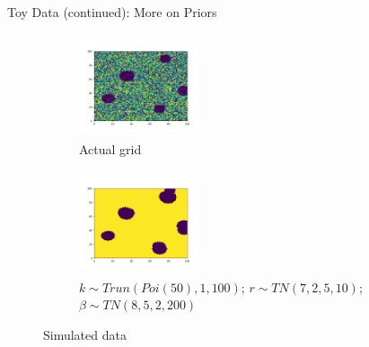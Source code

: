 \documentclass[10pt,mathserif]{beamer}
\begin{document}
\begin{frame}{Toy Data (continued): More on Priors}
\begin{figure}[t!]
    \centering
    \begin{subfigure}[t]{0.3\textwidth}
        \centering
        \includegraphics[height=1.2in, width=1.4in]{../sim_toydata2D_mu8/BDC_gridactual}
        \caption{Actual grid}
    \end{subfigure}%
    \begin{subfigure}[t]{0.3\textwidth}
        \centering
        \includegraphics[height=1.2in, width=1.4in]{../sim_toydata2D_mu8/BDC_grid1}
        \caption{$k \sim Trun(Poi(50), 1, 100)$; $r \sim TN(7, 2, 5, 10)$; $\beta \sim TN(8, 5, 2, 200)$}
    \end{subfigure} %
    \caption{Simulated data}
\end{figure}
\end{frame}
\end{document}
